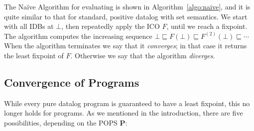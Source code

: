 The Na\"ive Algorithm for evaluating \datalogo is shown in
Algorithm~\ref{algo:naive}, and it is quite similar to that for
standard, positive datalog with set semantics.  We start with all IDBs
at $\bot$, then repeatedly apply the ICO $F$, until we reach a
fixpoint.
The algorithm computes the increasing sequence
$\bot \sqsubseteq F(\bot) \sqsubseteq F^{(2)}(\bot)
\sqsubseteq \cdots$ When the algorithm terminates we say that it {\em
  converges}; in that case it returns the least fixpoint of $F$.
Otherwise we say that the algorithm {\em diverges}.


\subsection{Convergence of \datalogo Programs}

\label{subsec:five:cases}


While every pure datalog program is guaranteed to have a least
fixpoint, this no longer holds for \datalogo programs.  As we mentioned
in the introduction, there are five possibilities, depending on the
POPS $\bm P$:

